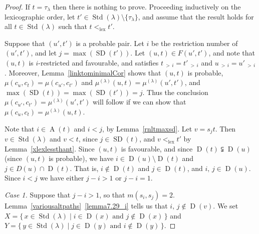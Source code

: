 \documentclass[ALCO,ThmDefs,Unicode,epreuves]{cedram}
\newenvironment{Case}[1]{\smallskip\noindent\emph{Case #1}\endgraf
 \nobreak\noindent\ignorespaces}{\endgraf\smallskip}
\DeclareMathOperator{\lex}{lex}
\newcommand{\morethan}[2]{#1\,{_{>\,#2}}}
\DeclareMathOperator{\STD}{Std}
\DeclareMathOperator{\SD}{SD}
\DeclareMathOperator{\D}{D}
\DeclareMathOperator{\A}{A}
\begin{document}
\begin{proof}
If $t=\tau_{\lambda}$ then there is nothing to prove. Proceeding inductively on
the lexicographic order, let $t'\in\STD(\lambda)\setminus\{\tau_\lambda\}$, and assume
that the result holds for all $t\in\STD(\lambda)$ such that $t<_{\lex} t'$.

Suppose that $(u',t')$ is a probable pair. Let $i$ be the restriction number
of $(u',t')$, and let $j=\max(\SD(t'))$. Let $(u,t)\in F(u',t')$, and note
that $(u,t)$ is $i$-restricted and favourable, and satisfies
$\morethan ti=\morethan {t'}i$
and $\morethan ui=\morethan {u'}i$. Moreover, Lemma~\ref{linktominimalCor} shows that
$(u,t)$ is probable, $\mu(c_{u},c_{t})=\mu(c_{u'},c_{t'})$ and
$\mu^{(\lambda)}(u,t)=\mu^{(\lambda)}(u',t')$, and $\max(\SD(t))=\max(\SD(t'))=j$.
Thus the conclusion $\mu(c_{u'},c_{t'})=\mu^{(\lambda)}(u',t')$ will
follow if we can show that $\mu(c_{u},c_{t})=\mu^{(\lambda)}(u,t)$.

Note that $i\in\A(t)$ and $i<j$, by Lemma~\ref{rnltmaxsd}. Let $v=s_jt$. Then
$v\in\STD(\lambda)$ and $v<t$, since $j\in\SD(t)$, and
$v<_{\lex}t'$ by Lemma~\ref{xlexlessthant}.
Since $(u,t)$ is favourable, and
since $\D(t)\subsetneqq\D(u)$ (since $(u,t)$ is probable),
we have $i\in\D(u)\setminus\D(t)$ and $j\in D(u)\cap\D(t)$. That is,
$i\notin\D(t)$ and $j\in\D(t)$, and $i,\,j\in\D(u)$.
Since $i<j$ we have either $j-i>1$ or $j-i=1$.

\begin{Case}{1.} Suppose that $j-i>1$, so that $m(s_i,s_j)=2$.
Lemma~\ref{variousaltpaths}~\ref{lemma7.29_i} tells us that $i,\,j\notin\D(v)$.
We set $X=\{\,x\in \STD(\lambda)\mid i\in\D(x)\text{ and }j\notin\D(x)\,\}$ and
$Y=\{\,y\in \STD(\lambda)\mid j\in\D(y)\text{ and }i\notin\D(y)\,\}$.


\end{Case}
\end{proof}
\end{document}
